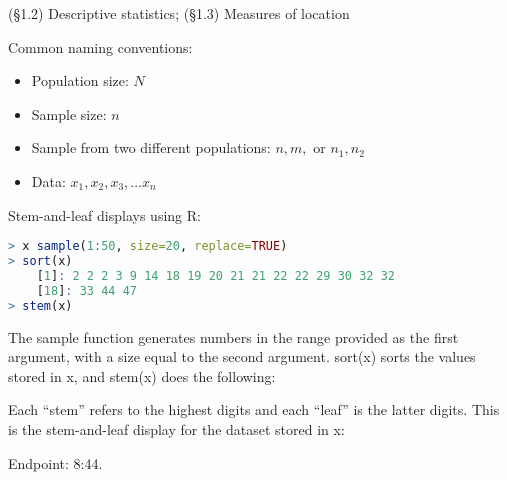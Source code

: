\documentclass[../Notes.tex]{subfiles}
\begin{document}
    (\S 1.2) Descriptive statistics; (\S 1.3) Measures of location

    Common naming conventions:
    \begin{itemize}
        \item Population size: $N$
        \item Sample size: $n$
        \item Sample from two different populations: $n, m,$ or $n_1, n_2$
        \item Data: $x_1, x_2, x_3, \dots x_n$
    \end{itemize}

    Stem-and-leaf displays using R:

\begin{lstlisting}[language=R]
> x sample(1:50, size=20, replace=TRUE)
> sort(x)
    [1]: 2 2 2 3 9 14 18 19 20 21 21 22 22 29 30 32 32
    [18]: 33 44 47
> stem(x)
\end{lstlisting}

    The sample function generates numbers in the range provided as the first argument, with a size equal to the second argument. sort(x) sorts the values stored in x, and stem(x) does the following:

    Each ``stem'' refers to the highest digits and each ``leaf'' is the latter digits. This is the stem-and-leaf display for the dataset stored in x:

    \begin{center}
    \end{center}

    Endpoint: 8:44.
\end{document}
